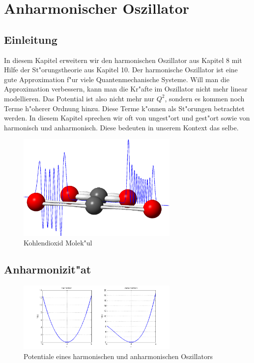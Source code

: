 \chapter{Anharmonischer Oszillator\label{chapter:anharmonisch}}
\begin{refsection}

\newpage
\section{Einleitung}
In diesem Kapitel erweitern wir den harmonischen Oszillator aus Kapitel 8 mit Hilfe der St"orungstheorie aus Kapitel 10. Der harmonische Oszillator ist eine gute Approximation f"ur viele Quantenmechanische Systeme. Will man die Approximation verbessern, kann man die Kr"afte im Oszillator nicht mehr linear modellieren. Das Potential ist also nicht mehr nur $Q^2$, sondern es kommen noch Terme h"oherer Ordnung hinzu. Diese Terme k"onnen als St"orungen betrachtet werden. In diesem Kapitel sprechen wir oft von ungest"ort und gest"ort sowie von harmonisch und anharmonisch. Diese bedeuten in unserem Kontext das selbe.

\begin{figure}[h]	%
\centering
\includegraphics[width=0.7\textwidth]{anharmonisch/images/Titelbild.png}
\caption{Kohlendioxid Molek"ul
\label{skript:Titelbild}}
\end{figure}

\section{Anharmonizit"at}

\begin{figure}[h]	%
\centering
\includegraphics[width=0.7\textwidth]{anharmonisch/images/Potential.png}
\caption{Potentiale eines harmonischen und anharmonischen Oszillators
\label{skript:Potentiale}}
\end{figure}


\end{refsection}
